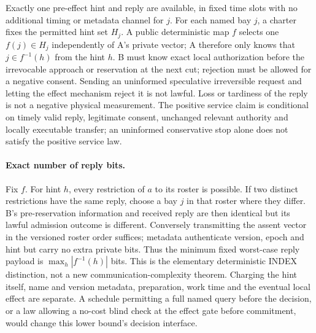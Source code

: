 \documentclass{article}
\begin{document}
Exactly one pre-effect hint and reply are available, in fixed time
slots with no additional timing or metadata channel for \(j\).
For each named bay \(j\), a charter fixes the permitted hint set
\(H_j\). A public deterministic map \(f\) selects one \(f(j)\in H_j\)
independently of A's private vector; A therefore only knows that
\(j\in f^{-1}(h)\) from the hint \(h\).
B must know exact local authorization before the irrevocable approach
or reservation at the next cut; rejection must be allowed for a
negative consent. Sending an uninformed speculative irreversible
request and letting the effect mechanism reject it is not lawful.
Loss or tardiness of the reply is not a negative physical measurement.
The positive service claim is conditional on timely valid reply,
legitimate consent, unchanged relevant authority and locally
executable transfer; an uninformed conservative stop alone does not
satisfy the positive service law.

\paragraph{Exact number of reply bits.}
Fix \(f\). For hint \(h\), every restriction of \(a\) to its roster is
possible. If two distinct restrictions have the same reply, choose a
bay \(j\) in that roster where they differ. B's pre-reservation
information and received reply are then identical but its lawful
admission outcome is different. Conversely transmitting the assent
vector in the versioned roster order suffices; metadata authenticate
version, epoch and hint but carry no extra private bits.
Thus the minimum fixed worst-case reply payload is
\(\max_h |f^{-1}(h)|\) bits. This is the elementary deterministic
INDEX distinction, not a new communication-complexity theorem.
Charging the hint itself, name and version metadata, preparation,
work time and the eventual local effect are separate. A schedule
permitting a full named query before the decision, or a law allowing a
no-cost blind check at the effect gate before commitment, would
change this lower bound's decision interface.
\end{document}
